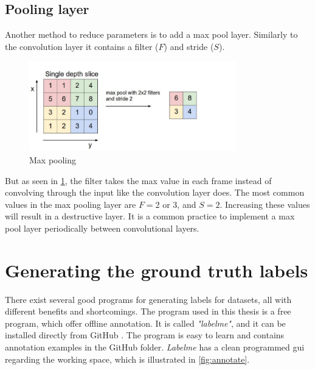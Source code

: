 \documentclass[USenglish]{ifimaster}  %
\begin{document}
\subsection{Pooling layer}
Another method to reduce parameters is to add a max pool layer. Similarly to the convolution layer it contains a filter ($F$) and stride ($S$). 

\begin{figure}[ht]
    \centering
    \includegraphics[width=0.8\textwidth]{bilder/max_pooling.png}
    \caption{Max pooling \cite{website:cs231n}}
    \label{fig:max_pooling}
\end{figure}

But as seen in \cref{fig:max_pooling}, the filter takes the max value in each frame instead of convolving through the input like the convolution layer does. The most common values in the max pooling layer are $F=$2 or 3, and $S=2$. Increasing these values will result in a destructive layer. It is a common practice to implement a max pool layer periodically between convolutional layers.

\section{Generating the ground truth labels}
There exist several good programs for generating labels for datasets, all with different benefits and shortcomings. The program used in this thesis is a free program, which offer offline annotation. It is called \textit{"labelme"}, and it can be installed directly from GitHub \cite{website:labelme}. The program is easy to learn and contains annotation examples in the GitHub folder. \textit{Labelme} has a clean programmed \ac{gui} regarding the working space, which is illustrated in \cref{fig:annotate}. 
\end{document}
